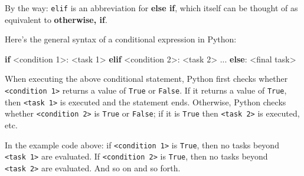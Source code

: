 \documentclass[
  11pt,
]{article}
\newenvironment{Shaded}{\begin{snugshade}}{\end{snugshade}}
\newcommand{\ControlFlowTok}[1]{\textcolor[rgb]{0.00,0.23,0.31}{\textbf{#1}}}
\newcommand{\DecValTok}[1]{\textcolor[rgb]{0.68,0.00,0.00}{#1}}
\newcommand{\NormalTok}[1]{\textcolor[rgb]{0.00,0.23,0.31}{#1}}
\newcommand{\OperatorTok}[1]{\textcolor[rgb]{0.37,0.37,0.37}{#1}}
\begin{document}
By the way: \texttt{elif} is an abbreviation for \textbf{else if}, which
itself can be thought of as equivalent to \textbf{otherwise, if}.

Here's the general syntax of a conditional expression in Python:

\begin{Shaded}
\begin{Highlighting}[]
\ControlFlowTok{if} \OperatorTok{\textless{}}\NormalTok{condition }\DecValTok{1}\OperatorTok{\textgreater{}}\NormalTok{:}
    \OperatorTok{\textless{}}\NormalTok{task }\DecValTok{1}\OperatorTok{\textgreater{}}
\ControlFlowTok{elif} \OperatorTok{\textless{}}\NormalTok{condition }\DecValTok{2}\OperatorTok{\textgreater{}}\NormalTok{:}
    \OperatorTok{\textless{}}\NormalTok{task }\DecValTok{2}\OperatorTok{\textgreater{}}
\NormalTok{...}
\ControlFlowTok{else}\NormalTok{:}
    \OperatorTok{\textless{}}\NormalTok{final task}\OperatorTok{\textgreater{}}
\end{Highlighting}
\end{Shaded}

When executing the above conditional statement, Python first checks
whether \texttt{\textless{}condition\ 1\textgreater{}} returns a value
of \texttt{True} or \texttt{False}. If it returns a value of
\texttt{True}, then \texttt{\textless{}task\ 1\textgreater{}} is
executed and the statement ends. Otherwise, Python checks whether
\texttt{\textless{}condition\ 2\textgreater{}} is \texttt{True} or
\texttt{False}; if it is \texttt{True} then
\texttt{\textless{}task\ 2\textgreater{}} is executed, etc.

\begin{tcolorbox}[enhanced jigsaw, bottomrule=.15mm, colframe=quarto-callout-important-color-frame, coltitle=black, left=2mm, title=\textcolor{quarto-callout-important-color}{\faExclamation}\hspace{0.5em}{Important}, opacityback=0, opacitybacktitle=0.6, leftrule=.75mm, breakable, bottomtitle=1mm, toprule=.15mm, rightrule=.15mm, arc=.35mm, titlerule=0mm, colback=white, toptitle=1mm, colbacktitle=quarto-callout-important-color!10!white]

In the example code above: if
\texttt{\textless{}condition\ 1\textgreater{}} is \texttt{True}, then no
tasks beyond \texttt{\textless{}task\ 1\textgreater{}} are evaluated. If
\texttt{\textless{}condition\ 2\textgreater{}} is \texttt{True}, then no
tasks beyond \texttt{\textless{}task\ 2\textgreater{}} are evaluated.
And so on and so forth.

\end{tcolorbox}
\end{document}
